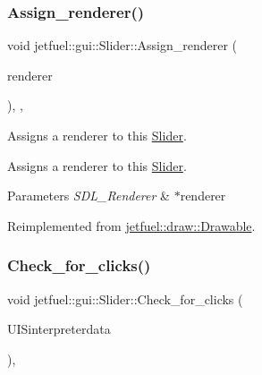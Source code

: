 \subsubsection{\texorpdfstring{Assign\+\_\+renderer()}{Assign\_renderer()}}
{\footnotesize\ttfamily void jetfuel\+::gui\+::\+Slider\+::\+Assign\+\_\+renderer (\begin{DoxyParamCaption}\item[{S\+D\+L\+\_\+\+Renderer $\ast$}]{renderer }\end{DoxyParamCaption})\hspace{0.3cm}{\ttfamily [inline]}, {\ttfamily [override]}, {\ttfamily [virtual]}}



Assigns a renderer to this \hyperlink{classjetfuel_1_1gui_1_1Slider}{Slider}. 

Assigns a renderer to this \hyperlink{classjetfuel_1_1gui_1_1Slider}{Slider}.


\begin{DoxyParams}{Parameters}
{\em S\+D\+L\+\_\+\+Renderer} & $\ast$renderer \\
\hline
\end{DoxyParams}


Reimplemented from \hyperlink{classjetfuel_1_1draw_1_1Drawable_a0d7257f197d6ffcdd89c3a99c93d1400}{jetfuel\+::draw\+::\+Drawable}.

\mbox{\label{classjetfuel_1_1gui_1_1Slider_a8a1e83cfea8d65db34da7447dce9fb6f}} 
\subsubsection{\texorpdfstring{Check\+\_\+for\+\_\+clicks()}{Check\_for\_clicks()}}
{\footnotesize\ttfamily void jetfuel\+::gui\+::\+Slider\+::\+Check\+\_\+for\+\_\+clicks (\begin{DoxyParamCaption}\item[{\hyperlink{structjetfuel_1_1control_1_1Action}{jetfuel\+::control\+::\+Action}}]{U\+I\+Sinterpreterdata }\end{DoxyParamCaption})\hspace{0.3cm}{\ttfamily [override]}, {\ttfamily [virtual]}}



